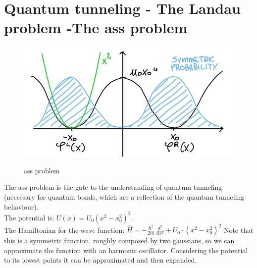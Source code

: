 \section{Quantum tunneling - The Landau problem -The ass problem}
\begin{figure}[htbp!]
	\centering
	\includegraphics[scale=0.30]{img_2.jpg}
	\label{fig:ass}
	\caption{ass problem}
\end{figure}
The ass problem is the gate to the understanding of quantum tunneling (necessary for quantum bonds, which are a reflection of the quantum tunneling behaviour). \\
The potential is: $U(x)=U_0(x^2-x_0^2)^2$.\\

The Hamiltonian for the wave function: $\hat{H}=-\frac{\hbar^2}{2m}\,\frac{d^2}{dx^2}+U_0\cdot(x^2-x_0^2)^2$
Note that this is a symmetric function, roughly composed by two gaussians, so we can approximate the function with an harmonic oscillator. Considering the potential to its lowest points it can be approximated and then expanded. \\

